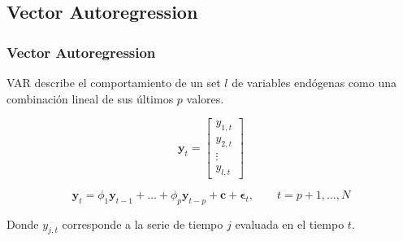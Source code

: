 \documentclass{beamer}
\begin{document}
        \subsection{Vector Autoregression}
            \begin{frame}
            \frametitle{Vector Autoregression}
            VAR describe el comportamiento de un set $l$ de
            variables endógenas como una combinación lineal de sus últimos $p$ valores.

            \begin{equation}
            \label{eq:variables}
            \mathbf{y}_t = 
            \begin{bmatrix} y_{1,t} \\
            y_{2,t} \\
            \vdots \\
            y_{l,t}
            \end{bmatrix}
            \end{equation}

            \begin{equation}
            \label{eq:var}
             \mathbf{y}_t = \phi_1 \mathbf{y}_{t-1}  + \dots +   \phi_p\mathbf{y}_{t-p}
             + \mathbf{c} + \mathbf{\epsilon}_t, \qquad t=p+1, \dots, N
             \end{equation}
            
            \noindent Donde $y_{j,t}$ corresponde a la serie de tiempo $j$ evaluada en el
            tiempo $t$.
            \end{frame}
\end{document}
